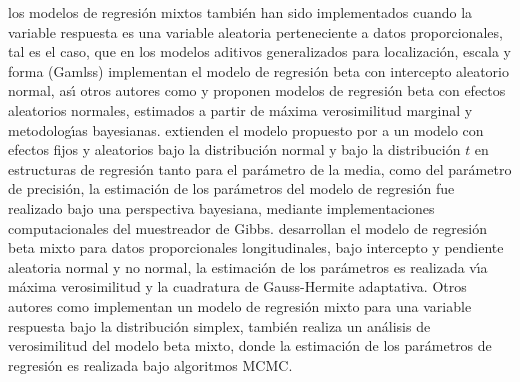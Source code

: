 los modelos de regresi\'{o}n mixtos tambi\'{e}n han sido implementados cuando la variable respuesta es una variable aleatoria perteneciente a datos proporcionales, tal es el caso, que \cite{Stasinopoulos2} en los modelos aditivos generalizados para localizaci\'{o}n, escala y forma (Gamlss) implementan el modelo de regresi\'{o}n beta con intercepto aleatorio normal, as\'{\i} otros autores como \cite{Verkuilen1} y \cite{Bonat1} proponen modelos de regresi\'{o}n beta con efectos aleatorios normales, estimados a partir de m\'{a}xima verosimilitud marginal y metodolog\'{\i}as bayesianas. \cite{Figueroa1} extienden el modelo propuesto por \cite{Ferrari2} a un modelo con efectos fijos y aleatorios bajo la distribuci\'{o}n normal y bajo la distribuci\'{o}n $t$ en estructuras de regresi\'{o}n tanto para el par\'{a}metro de la media, como del par\'{a}metro de precisi\'{o}n, la estimaci\'{o}n de los par\'{a}metros del modelo de regresi\'{o}n fue realizado bajo una perspectiva bayesiana, mediante implementaciones computacionales del muestreador de Gibbs. \cite{Usuga1} desarrollan el modelo de regresi\'{o}n beta mixto para datos proporcionales longitudinales, bajo intercepto y pendiente aleatoria normal y no normal, la estimaci\'{o}n de los par\'{a}metros es realizada v\'{\i}a m\'{a}xima verosimilitud y la cuadratura de Gauss-Hermite adaptativa. Otros autores como \cite{Song1} implementan un modelo de regresi\'{o}n mixto para una variable respuesta bajo la distribuci\'{o}n simplex, \cite{Bonat2} tambi\'{e}n realiza un an\'{a}lisis de verosimilitud del modelo beta mixto, donde la estimaci\'{o}n de los par\'{a}metros de regresi\'{o}n es realizada bajo algoritmos MCMC.\\

